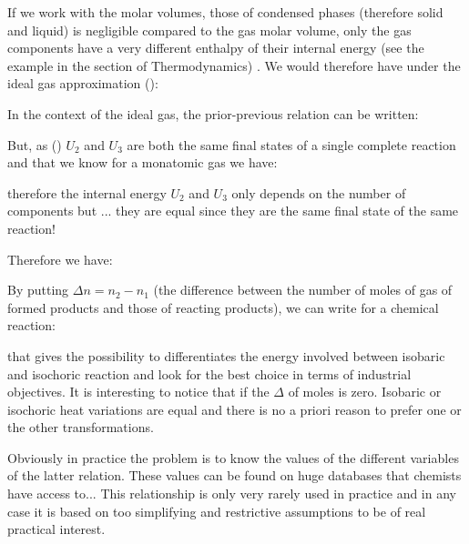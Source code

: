 	If we work with the molar volumes, those of condensed phases (therefore solid and liquid) is negligible compared to the gas molar volume, only the gas components have a very different enthalpy of their internal energy (see the example in the section of Thermodynamics) . We would therefore have under the ideal gas approximation ():
	
	In the context of the ideal gas, the prior-previous relation can be written:
	
	But, as () $U_2$ and $U_3$ are both the same final states of a single complete reaction and that we know for a monatomic gas we have:
	
	therefore the internal energy $U_2$ and $U_3$ only depends on the number of components but ... they are equal since they are the same final state of the same reaction!
	
	Therefore we have:
	
	By putting $\Delta n=n_2-n_1$ (the difference between the number of moles of gas of formed products and those of reacting products), we can write for a chemical reaction:
	
	that gives the possibility to differentiates the energy involved between isobaric and isochoric reaction and look for the best choice in terms of industrial objectives. It is interesting to notice that if the $\Delta$ of moles is zero. Isobaric or isochoric heat variations are equal and there is no a priori reason to prefer one or the other transformations.
	
	Obviously in practice the problem is to know the values of the different variables of the latter relation. These values can be found on huge databases that chemists have access to... This relationship is only very rarely used in practice and in any case it is based on too simplifying and restrictive assumptions to be of real practical interest.
	
